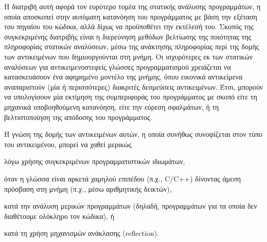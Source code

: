 


Η διατριβή αυτή αφορά τον ευρύτερο τομέα της στατικής ανάλυσης
προγραμμάτων, η οποία αποσκοπεί στην αυτόματη κατανόηση του
προγράμματος με βάση την εξέταση του πηγαίου του κώδικα, αλλά δίχως να
προϋποθέτει την εκτέλεσή του.
%
Σκοπός της συγκεκριμένης διατριβής είναι η διερεύνηση μεθόδων
βελτίωσης της ποιότητας της πληροφορίας στατικών αναλύσεων, μέσω της
ανάκτησης πληροφορίας περί της δομής των αντικειμένων που
δημιουργούνται στη μνήμη.  Οι ισχυρότερες εκ των στατικών αναλύσεων
για αντικειμενοστεφείς γλώσσες προγραμματισμού χρειάζεται να
κατασκευάσουν ένα αφηρημένο μοντέλο της μνήμης, όπου εικονικά
αντικείμενα αναπαριστούν (μία ή περισσότερες) διακριτές δεσμεύσεις
αντικειμένων.  Έτσι, μπορούν να υπολογίσουν μία εκτίμηση της
συμπεριφοράς του προγράμματος με σκοπό είτε τη μηχανικά υποβοηθούμενη
κατανόηση, είτε την εύρεση σφαλμάτων, ή τη βελτιστοποίηση της απόδοσης
του προγράμματος.

Η γνώση της δομής των αντικειμένων αυτών, η οποία συνήθως συνοψίζεται
στον τύπο του αντικειμένου, μπορεί να χαθεί μερικώς
\begin{inparaenum}[(1)]
\item λόγω χρήσης συγκεκριμένων προγραμματιστικών ιδιωμάτων,
\item όταν η γλώσσα είναι αρκετά χαμηλού επιπέδου (π.χ., {\en C/C++})
  δίνοντας άμεση πρόσβαση στη μνήμη (π.χ., μέσω αριθμητικής δεικτών),
\item κατά την ανάλυση μερικών προγραμμάτων (δηλαδή, προγραμμάτων για
  τα οποία δεν διαθέτουμε ολόκληρο τον κώδικα), ή
\item κατά τη χρήση μηχανισμών ανάκλασης ({\en reflection}).
\end{inparaenum}

